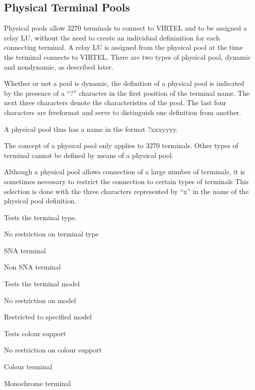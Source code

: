 \documentclass[letterpaper,10pt,english]{sphinxmanual}
\begin{document}
\subsection{Physical Terminal Pools}
\label{\detokenize{connectivity_guide:physical-terminal-pools}}\label{\detokenize{connectivity_guide:index-139}}
\sphinxAtStartPar
Physical pools allow 3270 terminals to connect to VIRTEL and to be assigned a relay LU, without the need to create an individual defininition for each connecting terminal. A relay LU is assigned from the physical pool at the time the terminal connects to VIRTEL. There are two types of physical pool, dynamic and non\sphinxhyphen{}dynamic, as described later.

\sphinxAtStartPar
Whether or not a pool is dynamic, the definition of a physical pool is indicated by the presence of a “?” character in the first position of the terminal name. The next three characters denote the characteristics of the pool. The last four characters are free\sphinxhyphen{}format and serve to distinguish one definition from another.

\sphinxAtStartPar
A physical pool thus has a name in the format ?xxxyyyy.

\sphinxAtStartPar
The concept of a physical pool only applies to 3270 terminals. Other types of terminal cannot be defined by means of a physical pool.

\sphinxAtStartPar
Although a physical pool allows connection of a large number of terminals, it is sometimes necessary to restrict the connection to certain types of terminals This selection is done with the three characters represented by “x” in the name of the physical pool definition.
\begin{description}
\sphinxAtStartPar
Tests the terminal type.
\begin{description}
\sphinxlineitem{*}
\sphinxAtStartPar
No restriction on terminal type

\sphinxAtStartPar
SNA terminal

\sphinxAtStartPar
Non SNA terminal

\end{description}

\sphinxAtStartPar
Tests the terminal model
\begin{description}
\sphinxlineitem{*}
\sphinxAtStartPar
No restriction on model

\sphinxAtStartPar
Restricted to specified model

\end{description}

\sphinxAtStartPar
Tests colour support
\begin{description}
\sphinxlineitem{*}
\sphinxAtStartPar
No restriction on colour support

\sphinxAtStartPar
Colour terminal

\sphinxAtStartPar
Monochrome terminal

\end{description}

\end{description}
\end{document}
